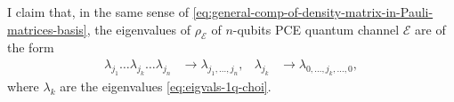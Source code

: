 \documentclass[11pt,dvipsnames]{article} %
\newcommand{\E}{\mathcal{E}}
\newcommand{\1}{\mathds{1}}
\begin{document}
I claim that, in the same sense of 
\eqref{eq:general-comp-of-density-matrix-in-Pauli-matrices-basis},
the eigenvalues of $\rho_{\E}$ of $n$-qubits PCE quantum channel
$\E$ are of the form
\begin{align}
\lambda_{j_1}\ldots \lambda_{j_k}\ldots \lambda_{j_n}
&\to\lambda_{j_1,\ldots,j_n}, &
\lambda_{j_k}&\to\lambda_{0,\ldots,j_k,\ldots,0},
\end{align}
where $\lambda_k$ are the eigenvalues \eqref{eq:eigvals-1q-choi}.



\end{document}
